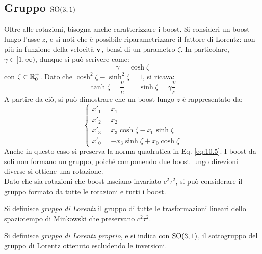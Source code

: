 \subsection{Gruppo \texorpdfstring{$ \mathrm{SO}(3,1) $}{TEXT}}

Oltre alle rotazioni, bisogna anche caratterizzare i boost. Si consideri un boost lungo l'asse $ z $, e si noti che è possibile riparametrizzare il fattore di Lorentz: non più in funzione della velocità $ \mathbf{v} $, bensì di un parametro $ \zeta $. In particolare, $ \gamma \in [1,\infty) $, dunque si può scrivere come:
\begin{equation}
	\gamma = \cosh \zeta
	\label{eq:10.15}
\end{equation}
con $ \zeta \in \mathbb{R}^+_0 $. Dato che $ \cosh^2 \zeta - \sinh^2 \zeta = 1 $, si ricava:
\begin{equation}
	\tanh \zeta = \frac{v}{c}
	\qquad
	\sinh \zeta = \gamma \frac{v}{c}
	\label{eq:10.16}
\end{equation}
A partire da ciò, si può dimostrare che un boost lungo $ z $ è rappresentato da:
\begin{equation}
	\begin{cases}
		x'_1 = x_1 \\
		x'_2 = x_2 \\
		x'_3 = x_3 \cosh \zeta - x_0 \sinh \zeta \\
		x'_0 = -x_3 \sinh \zeta + x_0 \cosh \zeta
	\end{cases}
	\label{eq:10.17}
\end{equation}
Anche in questo caso si preserva la norma quadratica in Eq. \ref{eq:10.5}. I boost da soli non formano un gruppo, poiché componendo due boost lungo direzioni diverse si ottiene una rotazione.\\
Dato che sia rotazioni che boost lasciano invariato $ c^2 \tau^2 $, si può considerare il gruppo formato da tutte le rotazioni e tutti i boost.

\begin{definition}
	Si definisce \textit{gruppo di Lorentz} il gruppo di tutte le trasformazioni lineari dello spaziotempo di Minkowski che preservano $ c^2 \tau^2 $.
\end{definition}

\begin{definition}
	Si definisce \textit{gruppo di Lorentz proprio}, e si indica con $ \mathrm{SO}(3,1) $, il sottogruppo del gruppo di Lorentz ottenuto escludendo le inversioni.
\end{definition}

